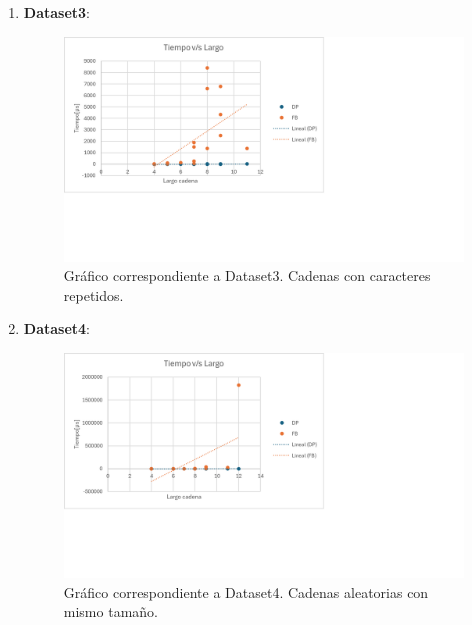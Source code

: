 \begin{enumerate}
    \item \textbf{Dataset3}: 
    \begin{figure}[H]
        \centering
        \includegraphics[width=\textwidth]{tikz/Grafico3.png}
        \caption{Gráfico correspondiente a Dataset3. Cadenas con caracteres repetidos.}
        \label{fig:dataset3}
    \end{figure}

    \item \textbf{Dataset4}: 
    \begin{figure}[H]
        \centering
        \includegraphics[width=\textwidth]{tikz/Grafico4.png}
        \caption{Gráfico correspondiente a Dataset4. Cadenas aleatorias con mismo tamaño.}
        \label{fig:dataset4}
    \end{figure}


\end{enumerate}

